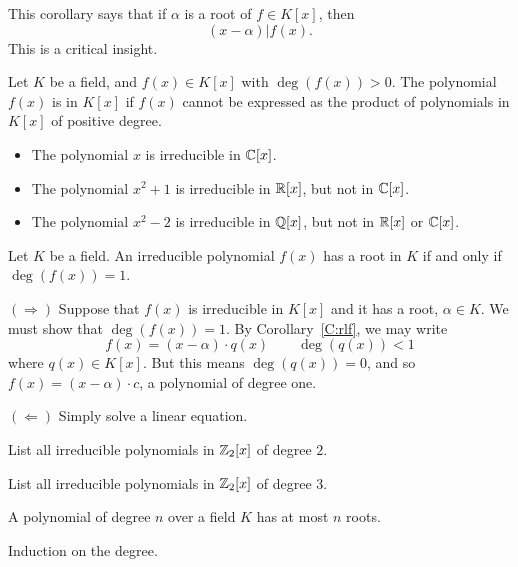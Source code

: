 \documentclass{ximera}
\begin{document}
This corollary says that if $\alpha$ is a root of $f\in K[x]$, then
\[
(x-\alpha) | f(x).
\]
This is a critical insight.


\begin{definition}
  Let $K$ be a field, and $f(x)\in K[x]$ with $\deg(f(x))>0$. The
  polynomial $f(x)$ is  in $K[x]$ if $f(x)$ cannot be
  expressed as the product of polynomials in $K[x]$ of positive
  degree.
\end{definition}

\begin{example}\hfil
  \begin{itemize}
  \item The polynomial $x$ is irreducible in $\mathbb C[x]$.
  \item The polynomial $x^2+1$ is irreducible in $\mathbb R[x]$, but not in
    $\mathbb C[x]$.
  \item The polynomial $x^2-2$ is irreducible in $\mathbb Q[x]$, but not in
    $\mathbb R[x]$ or $\mathbb C[x]$.
  \end{itemize}
\end{example}

\begin{corollary}
  Let $K$ be a field. An irreducible polynomial $f(x)$ has a root in
  $K$ if and only if $\deg(f(x))= 1$.
  \begin{sketch}
    $(\Rightarrow)$ Suppose that $f(x)$ is irreducible in $K[x]$ and
    it has a root, $\alpha\in K$. We must show that $\deg(f(x))=
    1$. By Corollary~\ref{C:rlf}, we may write
    \[
    f(x) = (x-\alpha)\cdot q(x)\qquad\deg(q(x))< 1
    \]
    where $q(x)\in K[x]$. But this means $\deg(q(x)) = 0$, and so
    $f(x) = (x-\alpha)\cdot c$, a polynomial of degree one.


    $(\Leftarrow)$ Simply solve a linear equation.
  \end{sketch}
\end{corollary}

\begin{exercise}
  List all irreducible polynomials in $\mathbb Z_2[x]$ of degree $2$.
\end{exercise}

\begin{exercise}
  List all irreducible polynomials in $\mathbb Z_2[x]$ of degree $3$.
\end{exercise}




\begin{theorem}
  A polynomial of degree $n$ over a field $K$ has at most $n$ roots.
  \begin{sketch}
    Induction on the degree.
  \end{sketch}
\end{theorem}
\end{document}

